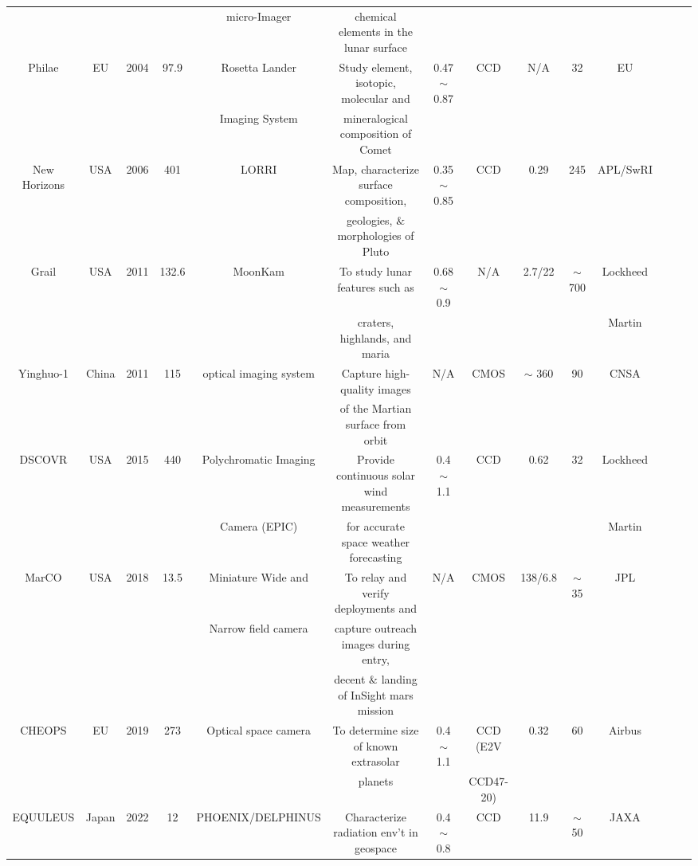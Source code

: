 \documentclass[final,5p,times,sort&compress,twocolumn]{elsarticle}
\begin{document}
\begin{table}
{\begin{tabular}{c c c c c c c c c c c c c c}
			& & & & micro-Imager & chemical elements in the lunar surface & & &  & & & &\\
			Philae & EU & 2004 & 97.9 & Rosetta Lander & Study element, isotopic, molecular and &0.47 $\sim$ 0.87 & CCD & N/A & 32 & EU & \cite{bibring2007rosetta, boehnhardt2017philae}\\
			& & & & Imaging System & mineralogical composition of Comet &  & & & & & &\\
			New Horizons & USA & 2006 & 401 & LORRI & Map, characterize surface composition, & 0.35 $\sim$ 0.85 & CCD & 0.29 & 245 &  APL/SwRI& \cite{stern2015pluto, weaver2009overview}\\
			& & & & & geologies, $\&$ morphologies of Pluto & & & & & & &\\
			Grail & USA & 2011 & 132.6 & MoonKam & To study lunar features such as  & 0.68 $\sim$ 0.9 & N/A & 2.7/22 & $\sim$ 700  & Lockheed& \cite{zuber2013gravity, williams2014lunar}\\
			& & & & & craters, highlands, and maria  & & & & &  Martin&\\
			Yinghuo-1 & China & 2011 & 115 & optical imaging system & Capture high-quality images & N/A & CMOS & $\sim$ 360 & 90  & CNSA & \cite{zheng2013china, hua2008yinghuo}\\
			& & & & & of the Martian surface from orbit & & & & & & &\\
			DSCOVR & USA & 2015 & 440 & Polychromatic Imaging & Provide continuous solar wind measurements  & 0.4 $\sim$ 1.1 & CCD & 0.62 & 32   & Lockheed & \cite{eoportal, marshak2018earth}\\
			& & & & Camera (EPIC) & for accurate space weather forecasting& & &  & &  Martin &\\
			MarCO & USA & 2018 & 13.5 & Miniature Wide and & To relay and verify deployments and  & N/A & CMOS & 138/6.8 & $\sim$ 35 &  JPL & \cite{schoolcraft2017marco, jpl2018}\\
			& & & & Narrow field camera & capture outreach images during entry, & & & & & && &\\
			& & & & & decent $\&$ landing of InSight mars mission & & & & && & &\\
			CHEOPS & EU & 2019 & 273 & Optical space camera & To determine size of known extrasolar  & 0.4 $\sim$ 1.1 & CCD (E2V & 0.32 & 60 &  Airbus & \cite{broeg2013cheops, fortier2014cheops}\\
			& & & & & planets & &  CCD47-20) & & & & & \\
			EQUULEUS & Japan & 2022 & 12 & PHOENIX/DELPHINUS  & Characterize radiation env't in geospace & 0.4 $\sim$ 0.8 & CCD & 11.9 & $\sim$50 &  JAXA & \cite{funase2020mission, ikari2019solar}\\

\end{tabular}}
\end{table}
\end{document}
